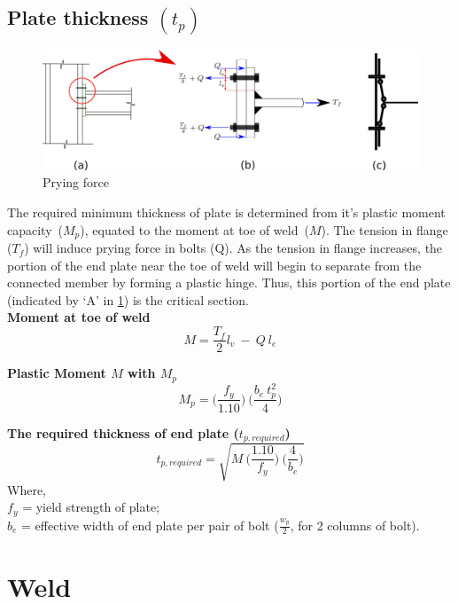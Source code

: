 \documentclass[11.5pt,a4paper,oneside]{report}
\begin{document}
\begin{Form}
\section{Plate thickness $(t_{p})$}
\begin{figure}[h]
	\centering
	\includegraphics[width=0.8\linewidth]{prying.png}
	\caption{Prying force}
	\label{fig:prying}
\end{figure}


The required minimum thickness of plate is determined from it's plastic moment capacity~($M_p$), equated to the moment at toe of weld~($M$). The tension in flange ($T_f$) will induce prying force in bolts (Q). As the tension in flange increases, the portion of the end plate near the toe of weld will begin to separate from the connected member by forming a plastic hinge. Thus, this portion of the end plate (indicated by `A' in \ref{fig:prying}) is the critical section.\\


\textbf{Moment at toe of weld} \\
	\begin{equation}
		M = \frac{T_f}{2}  l_v ~ - ~ Q ~ l_e
	\end{equation}

\textbf{Plastic Moment $M$ with $M_p$} \\
	\begin{equation}
		M_p = \bigg(\frac{f_y}{1.10}\bigg) ~ \bigg(\frac{b_e~t_{p}^{2}}{4}\bigg)
	\end{equation}
	
\textbf{The required thickness of end plate ($t_{p,required}$)} \\

	\begin{equation}
		t_{p,required} = \sqrt{M~ \bigg(\frac{1.10}{f_y}\bigg) ~ \bigg(\frac{4}{b_e}\bigg)}
	\end{equation}
	Where, \\
\indent $f_y$ = yield strength of plate; \\
\indent $b_e$ = effective width of end plate per pair of bolt ($\frac{w_p}{2}$, for 2 columns of bolt).


\chapter{Weld}


\end{Form}
\end{document}
